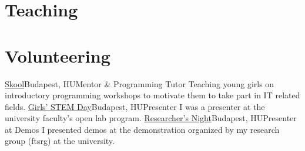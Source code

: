 \documentclass[11pt,a4paper,sans]{moderncv}        %
\newcommand{\weblink}[2]{{\href{#1}{#2}}}
\begin{document}
\section{\faBook{} Teaching}


\section{\faHandshake{} Volunteering}
%
%
{\weblink{https://skool.org.hu/}{Skool}}{Budapest, HU}{Mentor \& Programming Tutor}{}%
{Teaching young girls on introductory programming workshops to motivate them to take part in IT related fields.}
%
%
{\weblink{https://lanyoknapja.hu/}{Girls' STEM Day}}{Budapest, HU}{Presenter}{}%
{I was a presenter at the university faculty's open lab program.}
%
%
{\weblink{https://www.kutatokejszakaja.hu/}{Researcher's Night}}{Budapest, HU}{Presenter at Demos}{}%
{I presented demos at the demonstration organized by my research group (ftsrg) at the university.}
\end{document}
